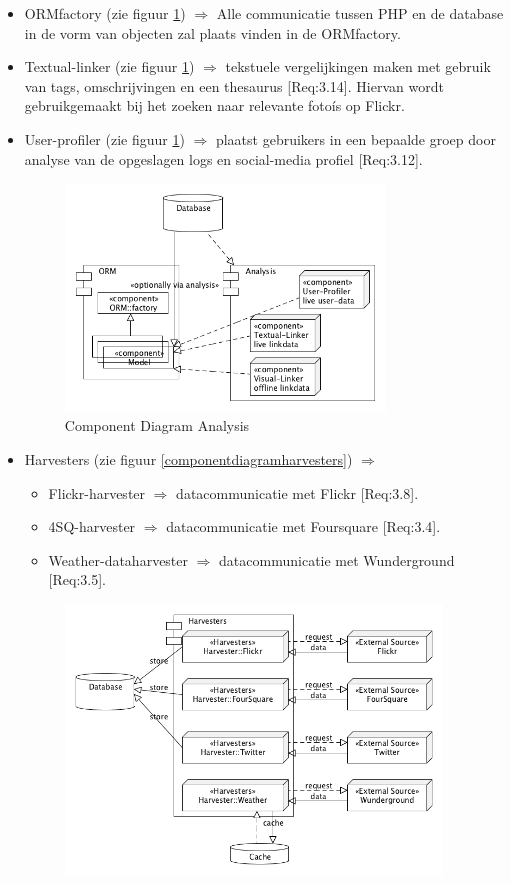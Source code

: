 \documentclass[a4paper,10pt]{article}
\begin{document}
\begin{itemize}
			\item ORMfactory (zie figuur \ref{componentdiagramanalysis}) $\Rightarrow$ Alle communicatie tussen PHP en de database in de vorm van objecten zal plaats vinden in de ORMfactory.
			\item Textual-linker (zie figuur \ref{componentdiagramanalysis}) $\Rightarrow$ tekstuele vergelijkingen maken met gebruik van tags, omschrijvingen en een thesaurus [Req:3.14]. Hiervan wordt gebruikgemaakt bij het zoeken naar relevante fotoís op Flickr.
			\item User-profiler (zie figuur \ref{componentdiagramanalysis}) $\Rightarrow$ plaatst gebruikers in een bepaalde groep door analyse van de opgeslagen logs en social-media profiel [Req:3.12].
				\begin{figure}[ht!]
				\centering
				\includegraphics[width=8.5cm]{componentDiagram_analysis.png}
				\caption{Component Diagram Analysis \label{componentdiagramanalysis}}
				\end{figure}
			\item Harvesters (zie figuur \ref{componentdiagramharvesters}) $\Rightarrow$
				\begin{itemize}
					\item Flickr-harvester $\Rightarrow$ datacommunicatie met Flickr [Req:3.8].
					\item 4SQ-harvester $\Rightarrow$ datacommunicatie met Foursquare [Req:3.4].
					\item Weather-dataharvester $\Rightarrow$ datacommunicatie met Wunderground [Req:3.5]. 
				\end{itemize}
				\begin{figure}[ht!]
				\centering
				\includegraphics[width=10cm]{componentDiagram_harvesters.png}

\end{figure}
\end{itemize}
\end{document}
